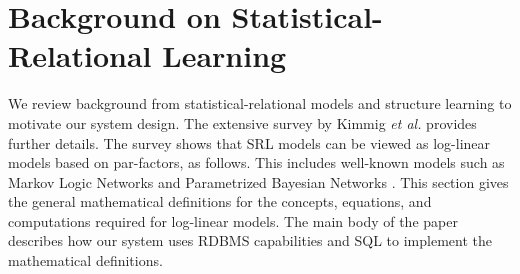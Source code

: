 %
%
%


\section{Background on Statistical-Relational Learning} 

We review background from statistical-relational models and structure learning to motivate our system design. The extensive survey by Kimmig {\em et al.} \cite{Kimmig2015} provides further details. The survey shows that SRL models can be viewed as log-linear models based on par-factors, as follows. This includes well-known models such as Markov Logic Networks \cite{Domingos2009} and Parametrized Bayesian Networks \cite{Poole2003,Russell2010}. This section gives the general mathematical definitions for the concepts, equations, and computations required for log-linear models. The main body of the paper describes how our \FB system uses RDBMS capabilities and SQL to implement the mathematical definitions. 

